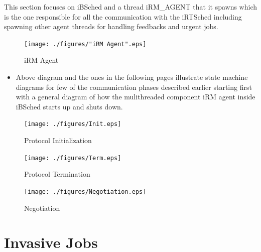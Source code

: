 This section focuses on iBSched and a thread iRM\_AGENT that it spawns which is the one responsible for all the communication with the iRTSched including spawning other agent threads for handling feedbacks and urgent jobs.
\begin{figure}[h]
\centering
\texttt{[image: ./figures/"iRM Agent".eps]}
\caption{iRM Agent}
\label{fig:Init}
\end{figure}
\begin{itemize}
\item Above diagram and the ones in the following pages illustrate state machine diagrams for few of the communication phases described earlier starting first with a general diagram of how the mulithreaded component iRM agent inside iBSched starts up and shuts down.
\end{itemize}
\vspace{-20mm}
\begin{figure}[h]
\centering
\texttt{[image: ./figures/Init.eps]}
\caption{Protocol Initialization}
\label{fig:Init}
\end{figure}
\vspace{5mm}
\begin{figure}[h]
\centering
\texttt{[image: ./figures/Term.eps]}
\caption{Protocol Termination}
\label{fig:Term}
\end{figure}
\clearpage
\begin{figure}[h]
\centering
\texttt{[image: ./figures/Negotiation.eps]}
\caption{Negotiation}
\label{fig:Neg}
\end{figure}
\clearpage

\section{Invasive Jobs}
